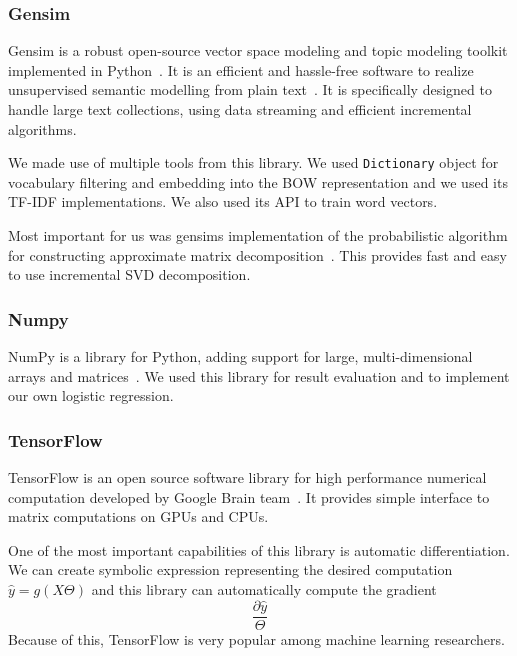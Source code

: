     \subsubsection{Gensim}
    
    Gensim is a robust open-source vector space modeling and topic modeling toolkit implemented in Python~\cite{rehurek_lrec}. 
    It is an efficient and hassle-free software to realize unsupervised semantic modelling from plain text~\cite{bird2009natural}. %
    It is specifically designed to handle large text collections, using data streaming and efficient incremental algorithms. 
    
    We made use of multiple tools from this library. 
    We used \texttt{Dictionary} object for vocabulary filtering and embedding into the BOW representation and we used its TF-IDF implementations.
    We also used its API to train word vectors. 
    
    Most important for us was gensims implementation of the probabilistic algorithm for constructing approximate matrix decomposition~\cite{halko2011finding}.
    This provides fast and easy to use incremental SVD decomposition.
    
    \subsubsection{Numpy}
    
    NumPy is a library for Python, adding support for large, multi-dimensional arrays and matrices~\cite{oliphant2006guide}. %
    We used this library for result evaluation and to implement our own logistic regression.
    
    \subsubsection{TensorFlow}
    
    TensorFlow is an open source software library for high performance numerical computation developed by Google Brain team~\cite{tensorflow2015-whitepaper}. 
    It provides simple interface to matrix computations on GPUs and CPUs.
    
    One of the most important capabilities of this library is automatic differentiation.
    We can create symbolic expression representing the desired computation $\hat{y}=g(X\Theta)$ and this library can automatically compute the gradient $$\frac{\partial \hat{y}}{\Theta}$$
    Because of this, TensorFlow is very popular among  machine learning researchers.
    
